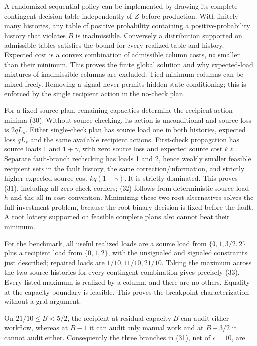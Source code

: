 \documentclass[
  11pt,
  a4paper,
]{article}
\begin{document}
A randomized sequential policy can be implemented by drawing its
complete contingent decision table independently of \(Z\) before
production. With finitely many histories, any table of positive
probability containing a positive-probability history that violates
\(B\) is inadmissible. Conversely a distribution supported on admissible
tables satisfies the bound for every realized table and history.
Expected cost is a convex combination of admissible column costs, no
smaller than their minimum. This proves the finite global solution and
why expected-load mixtures of inadmissible columns are excluded. Tied
minimum columns can be mixed freely. Removing a signal never permits
hidden-state conditioning; this is enforced by the single recipient
action in the no-check plan.

For a fixed source plan, remaining capacities determine the recipient
action minima (30). Without source checking, its action is unconditional
and source loss is \(2qL_s\). Either single-check plan has source load
one in both histories, expected loss \(qL_s\) and the same available
recipient actions. First-check propagation has source loads 1 and
\(1+\gamma\), with zero source loss and expected source cost \(k\ell\).
Separate fault-branch rechecking has loads 1 and 2, hence weakly smaller
feasible recipient sets in the fault history, the same
correction/information, and strictly higher expected source cost
\(kq(1-\gamma)\). It is strictly dominated. This proves (31), including
all zero-check corners; (32) follows from deterministic source load
\(h\) and the all-in cost convention. Minimizing these two root
alternatives solves the full investment problem, because the root binary
decision is fixed before the fault. A root lottery supported on feasible
complete plans also cannot beat their minimum.

For the benchmark, all useful realized loads are a source load from
\(\{0,1,3/2,2\}\) plus a recipient load from \(\{0,1,2\}\), with the
unsignaled and signaled constraints just described; repaired loads are
\(1/10,11/10,21/10\). Taking the maximum across the two source histories
for every contingent combination gives precisely (33). Every listed
maximum is realized by a column, and there are no others. Equality at
the capacity boundary is feasible. This proves the breakpoint
characterization without a grid argument.

On \(21/10\leq B<5/2\), the recipient at residual capacity \(B\) can
audit either workflow, whereas at \(B-1\) it can audit only manual work
and at \(B-3/2\) it cannot audit either. Consequently the three branches
in (31), net of \(c=10\), are
\end{document}
